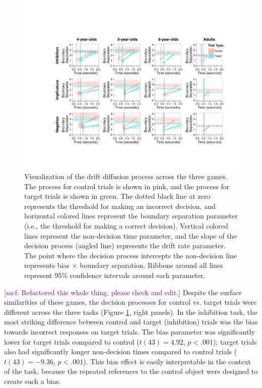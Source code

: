 \documentclass[10pt,letterpaper]{article}
\newcommand{\mcf}[1]{\textcolor{Purple}{[mcf: #1]}}
\begin{document}
\begin{figure}[t!]
\begin{center}
\includegraphics[width=7in]{figures/ddm_vis.pdf}
\caption{\label{fig:ddm} Visualization of the drift diffusion process across the three games. The process for control trials is shown in pink, and the process for target trials is shown in green. The dotted black line at zero represents the threshold for making an incorrect decision, and horizontal colored lines represent the boundary separation parameter (i.e., the threshold for making a correct decision). Vertical colored lines represent the non-decision time parameter, and the slope of the decision process (angled line) represents the drift rate parameter. The point where the decision process intercepts the non-decision line represents bias $\times$ boundary separation. Ribbons around all lines represent 95\% confidence intervals around each parameter.}
\end{center}
\end{figure}

\mcf{Refactored this whole thing, please check and edit.}
Despite the surface similarities of these games, the decision processes for control vs. target trials were different across the three tasks (Figure \ref{fig:ddm}, right panels). In the inhibition task, the most striking difference between control and target (inhibition) trials was the bias towards incorrect responses on target trials. The bias parameter was significantly lower  for target trials compared to control ($t(43) = 4.92$, $p< .001$); target trials also had significantly longer non-decision times compared to control trials ($t(43) = -9.36$, $p< .001$). This bias effect is easily interpretable in the context of the task, because the repeated references to the control object were designed to create such a bias.
\end{document}
